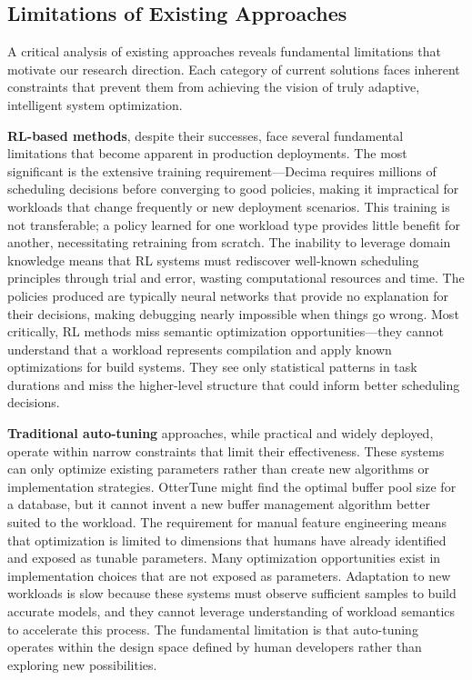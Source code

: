 \subsection{Limitations of Existing Approaches}

A critical analysis of existing approaches reveals fundamental limitations that motivate our research direction. Each category of current solutions faces inherent constraints that prevent them from achieving the vision of truly adaptive, intelligent system optimization.

\textbf{RL-based methods}, despite their successes, face several fundamental limitations that become apparent in production deployments. The most significant is the extensive training requirement—Decima requires millions of scheduling decisions before converging to good policies, making it impractical for workloads that change frequently or new deployment scenarios. This training is not transferable; a policy learned for one workload type provides little benefit for another, necessitating retraining from scratch. The inability to leverage domain knowledge means that RL systems must rediscover well-known scheduling principles through trial and error, wasting computational resources and time. The policies produced are typically neural networks that provide no explanation for their decisions, making debugging nearly impossible when things go wrong. Most critically, RL methods miss semantic optimization opportunities—they cannot understand that a workload represents compilation and apply known optimizations for build systems. They see only statistical patterns in task durations and miss the higher-level structure that could inform better scheduling decisions.

\textbf{Traditional auto-tuning} approaches, while practical and widely deployed, operate within narrow constraints that limit their effectiveness. These systems can only optimize existing parameters rather than create new algorithms or implementation strategies. OtterTune might find the optimal buffer pool size for a database, but it cannot invent a new buffer management algorithm better suited to the workload. The requirement for manual feature engineering means that optimization is limited to dimensions that humans have already identified and exposed as tunable parameters. Many optimization opportunities exist in implementation choices that are not exposed as parameters. Adaptation to new workloads is slow because these systems must observe sufficient samples to build accurate models, and they cannot leverage understanding of workload semantics to accelerate this process. The fundamental limitation is that auto-tuning operates within the design space defined by human developers rather than exploring new possibilities.

